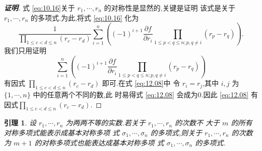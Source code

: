 \documentclass[a4paper]{article}
\newtheorem{lemma}{引理}[section]
\newcommand{\pa}{\partial} \newcommand{\Om}{\Omega}
\begin{document}
\begin{proof}[\bf{证明}]
  式 \eqref{eq:10.16}关于 $r_1,\cdots,r_n$ 的对称性是显然的,关键是证明
  该式是关于$r_1,\cdots,r_n$ 的多项式.为此,将式 \eqref{eq:10.16} 化为
  \begin{equation}
    \label{eq:10.26}
    \frac{1}{\prod_{1\leq c<d\leq
        n}(r_c-r_d)}\sum_{i=1}^n\left((-1)^{i+1}\frac{\pa f}{\pa r_i}\prod_{1\leq p<q\leq n;p,q\neq i}(r_p-r_q)\right).
  \end{equation}
  我们只用证明
  \begin{equation}
    \label{eq:12.08}
    \sum_{i=1}^n\left((-1)^{i+1}\frac{\pa f}{\pa r_{i}}\prod_{1\leq p<q\leq n;p,q\neq i}(r_p-r_q)\right)
  \end{equation}
  有因式 $\prod_{1\leq c<d\leq n}(r_c-r_d)$ 即可.在式 \ref{eq:12.08}中
  令 $r_i=r_j$,其中 $i,j$ 为 $\{1,\cdots,n\}$ 中的任意两个不同的数,此
  时易得式 \eqref{eq:12.08} 会成为$0$.因此 \eqref{eq:12.08} 有因式$\prod_{1\leq c<d\leq n}(r_c-r_d)$.
\end{proof}
\begin{lemma}
  设 $r_1,\cdots,r_n$ 为两两不等的实数.若关于 $r_1,\cdots,r_n$ 的次数不
  大于 $m$ 的所有对称多项式能表示成基本对称多项
  式 $\sigma_1,\cdots,\sigma_n$ 的多项式,则关于 $r_1,\cdots,r_n$ 的次数
  为 $m+1$ 的对称多项式也能表达成基本对称多项
  式 $\sigma_1,\cdots,\sigma_n$ 的多项式.
\end{lemma}
\end{document}
